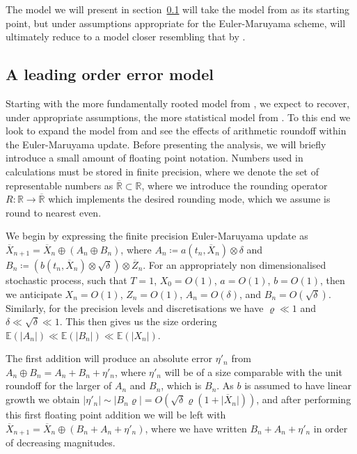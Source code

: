 \documentclass[manuscript,review]{acmart}
\begin{document}
The model we will present in section~\ref{sec:a_leading_order_error_model} will take the model from \citet{omland2016mixed} as its starting point, but under assumptions appropriate for the Euler-Maruyama scheme, will ultimately reduce to a model closer resembling that by \citet{arciniega2003rounding}.

\subsection{A leading order error model}
\label{sec:a_leading_order_error_model}

Starting with the more fundamentally rooted model from \citet{omland2016mixed}, we expect to recover, under appropriate assumptions, the more statistical model from \citet{arciniega2003rounding}. To this end we look to expand the model from \citet{omland2016mixed} and see the effects of arithmetic roundoff within the Euler-Maruyama update. Before presenting the analysis, we will briefly introduce a small amount of floating point notation. Numbers used in calculations must be stored in finite precision, where we denote the set of representable numbers as $ \overline{\mathbb{R}} \subset \mathbb{R}$, where we introduce the rounding operator $ R \colon \mathbb{R} \to \overline{\mathbb{R}}$ which implements the desired rounding mode, which we assume is round to nearest even.

We begin by expressing the finite precision Euler-Maruyama update as  
$ \overline{X}_{n+1} = \overline{X}_n \oplus (A_n \oplus B_n ) $, where $ A_n \coloneqq 
a(t_n, \overline{X}_n) \otimes \delta $ and $ B_n \coloneqq  (b(t_n, \overline{X}_n) \otimes \sqrt{\delta}) \otimes \overline{Z}_n $. For an appropriately non dimensionalised stochastic process, such that $ T = 1 $, $ X_0 = O(1) $, $ a = O(1) $, $ b = O(1) $, then we anticipate $ X_n = O(1) $, $ Z_n = O(1) $, $ A_n = O(\delta) $, and $ B_n = O(\sqrt{\delta}) $. Similarly, for the precision levels and discretisations we have $ \varrho \ll 1 $ and $ \delta \ll \sqrt{\delta} \ll 1 $. This then gives us the size ordering $ \mathbb{E}(\lvert A_n \rvert) \ll \mathbb{E}(\lvert B_n \rvert) \ll \mathbb{E}(\lvert X_n \rvert)$.

The first addition will produce an absolute error $ \eta'_n $ from $ A_n \oplus B_n = A_n + B_n + \eta'_n  $, where $ \eta'_n $ will be of  a size comparable with the unit roundoff for the larger of $ A_n $ and $ B_n $, which is $ B_n $. As $ b $ is assumed to have linear growth we obtain $ \lvert \eta'_n\rvert  \sim \lvert B_n \varrho\rvert  = O(\sqrt{\delta} \varrho (1 + \lvert\overline{X}_n\rvert))$, and after performing this first floating point addition we will be left with
$ \overline{X}_{n+1} = \overline{X}_n \oplus (B_n + A_n + \eta'_n ) $,
where we have written $ B_n + A_n + \eta'_n $ in order of decreasing magnitudes. 
\end{document}
